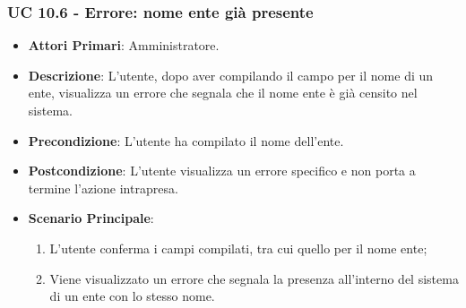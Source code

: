 			\subsubsection{UC 10.6 - Errore: nome ente già presente}
			\begin{itemize}
				\item \textbf{Attori Primari}: Amministratore.
				\item \textbf{Descrizione}: L'utente, dopo aver compilando il campo per il nome di un ente, visualizza un errore che segnala che il nome ente è già censito nel sistema.
				\item \textbf{Precondizione}: L'utente ha compilato il nome dell'ente.
				\item \textbf{Postcondizione}: L'utente visualizza un errore specifico e non porta a termine l'azione intrapresa.
				\item \textbf{Scenario Principale}:
				\begin{enumerate}
					\item{L'utente conferma i campi compilati, tra cui quello per il nome ente;}
					\item{Viene visualizzato un errore che segnala la presenza all'interno del sistema di un ente con lo stesso nome.}
				\end{enumerate}	
			\end{itemize}			